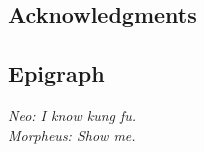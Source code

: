 \documentclass[
	12pt,
	]{article}
\numberwithin{equation}{section}
\theoremstyle{definition}
\theoremstyle{plain}
\theoremstyle{plain}
\theoremstyle{plain}
\begin{document}
\thispagestyle{empty}


\subsection*{Acknowledgments}

\thispagestyle{empty}


\subsection*{Epigraph}



\begin{flushright}
	
\textit{Neo: I know kung fu. \\
		Morpheus: Show me.}
\end{flushright}


\thispagestyle{empty}

\newpage


{\onehalfspacing
	\begin{abstract}
		\vspace*{0.5cm}
		
		\lipsum[1]
		
\end{abstract}
}

\thispagestyle{empty}



{
	\onehalfspacing
	\begin{abstract}
		\vspace*{0.5cm}
		
		\lipsum[1]
		
\end{abstract}
}

\thispagestyle{empty}

\newpage
\end{document}
